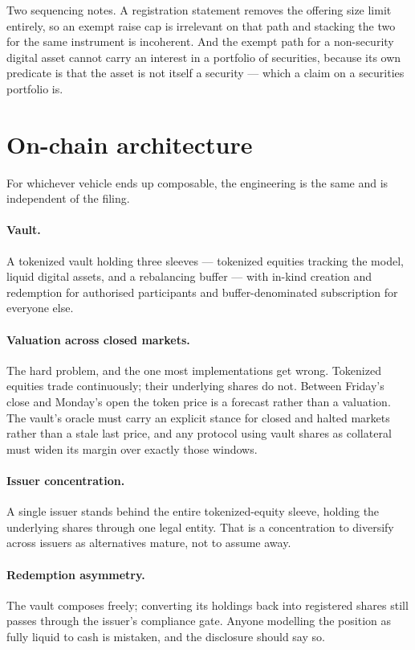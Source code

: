 \documentclass[11pt,a4paper]{article}
\begin{document}
Two sequencing notes. A registration statement removes the offering size limit
entirely, so an exempt raise cap is irrelevant on that path and stacking the two
for the same instrument is incoherent. And the exempt path for a non-security
digital asset cannot carry an interest in a portfolio of securities, because its
own predicate is that the asset is not itself a security --- which a claim on a
securities portfolio is.

\section{On-chain architecture}

For whichever vehicle ends up composable, the engineering is the same and is
independent of the filing.

\paragraph{Vault.} A tokenized vault holding three sleeves --- tokenized equities
tracking the model, liquid digital assets, and a rebalancing buffer --- with
in-kind creation and redemption for authorised participants and buffer-denominated
subscription for everyone else.

\paragraph{Valuation across closed markets.} The hard problem, and the one most
implementations get wrong. Tokenized equities trade continuously; their underlying
shares do not. Between Friday's close and Monday's open the token price is a
forecast rather than a valuation. The vault's oracle must carry an explicit stance
for closed and halted markets rather than a stale last price, and any protocol
using vault shares as collateral must widen its margin over exactly those windows.

\paragraph{Issuer concentration.} A single issuer stands behind the entire
tokenized-equity sleeve, holding the underlying shares through one legal entity.
That is a concentration to diversify across issuers as alternatives mature, not to
assume away.

\paragraph{Redemption asymmetry.} The vault composes freely; converting its
holdings back into registered shares still passes through the issuer's compliance
gate. Anyone modelling the position as fully liquid to cash is mistaken, and the
disclosure should say so.
\end{document}

